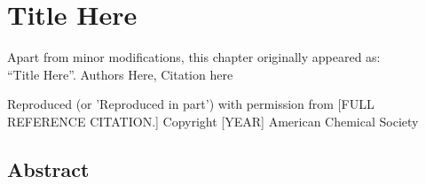 \chapter{Title Here}
\thispagestyle{plain}
\vspace{-.5cm}

\noindent Apart from minor modifications, this chapter originally appeared as:\newline\\
\ssp ``Title Here''.
Authors Here, Citation here

Reproduced (or
'Reproduced in part') with permission from [FULL REFERENCE CITATION.] Copyright [YEAR] American Chemical
Society

\section*{Abstract}
    \dsp
    


